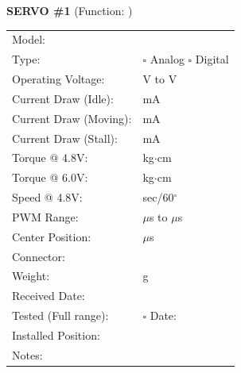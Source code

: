 \documentclass[10pt,letterpaper]{article}
\begin{document}
\textbf{SERVO \#1} (Function: \underline{\hspace{4cm}})
\begin{tabularx}{\textwidth}{lX}
Model: & \underline{\hspace{8cm}} \\
Type: & $\square$ Analog $\square$ Digital \\
Operating Voltage: & \underline{\hspace{2cm}} V to \underline{\hspace{2cm}} V \\
Current Draw (Idle): & \underline{\hspace{3cm}} mA \\
Current Draw (Moving): & \underline{\hspace{3cm}} mA \\
Current Draw (Stall): & \underline{\hspace{3cm}} mA \\
Torque @ 4.8V: & \underline{\hspace{3cm}} kg$\cdot$cm \\
Torque @ 6.0V: & \underline{\hspace{3cm}} kg$\cdot$cm \\
Speed @ 4.8V: & \underline{\hspace{3cm}} sec/60$^\circ$ \\
PWM Range: & \underline{\hspace{2cm}} $\mu$s to \underline{\hspace{2cm}} $\mu$s \\
Center Position: & \underline{\hspace{3cm}} $\mu$s \\
Connector: & \underline{\hspace{6cm}} \\
Weight: & \underline{\hspace{3cm}} g \\[0.5em]
Received Date: & \underline{\hspace{4cm}} \\
Tested (Full range): & $\square$ \quad Date: \underline{\hspace{3cm}} \\
Installed Position: & \underline{\hspace{6cm}} \\
Notes: & \underline{\hspace{10cm}} \\
\end{tabularx}

\vspace{1em}
\end{document}
